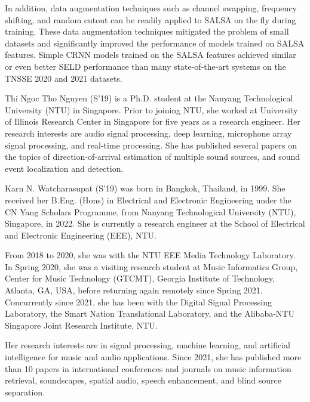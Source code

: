 \documentclass[journal]{IEEEtran}
\begin{document}
In addition, data augmentation techniques such as channel swapping, frequency shifting, and random cutout can be readily applied to SALSA on the fly during training. These data augmentation techniques mitigated the problem of small datasets and significantly improved the performance of models trained on SALSA features. Simple CRNN models trained on the SALSA features achieved similar or even better SELD performance than many state-of-the-art systems on the TNSSE 2020 and 2021 datasets.  



\clearpage
\begin{IEEEbiography}{Thi Ngoc Tho Nguyen} (S'19)
is a Ph.D. student at the Nanyang Technological University (NTU) in Singapore. Prior to joining NTU, she worked at University of Illinois Research Center in Singapore for five years as a research engineer. Her research interests are audio signal processing, deep learning, microphone array signal processing, and real-time processing. She has published several papers on the topics of direction-of-arrival estimation of multiple sound sources, and sound event localization and detection.
\end{IEEEbiography}

\begin{IEEEbiography}{Karn N. Watcharasupat} (S'19) was born in Bangkok, Thailand, in 1999. She received her B.Eng. (Hons) in Electrical and Electronic Engineering under the CN Yang Scholars Programme, from Nanyang Technological University (NTU), Singapore, in 2022. She is currently a research engineer at the School of Electrical and Electronic Engineering (EEE), NTU.

From 2018 to 2020, she was with the NTU EEE Media Technology Laboratory. In Spring 2020, she was a visiting research student at Music Informatics Group, Center for Music Technology (GTCMT), Georgia Institute of Technology, Atlanta, GA, USA, before returning again remotely since Spring 2021. Concurrently since 2021, she has been with the Digital Signal Processing Laboratory, the Smart Nation Translational Laboratory, and the Alibaba-NTU Singapore Joint Research Institute, NTU.

Her research interests are in signal processing, machine learning, and artificial intelligence for music and audio applications. Since 2021, she has published more than 10 papers in international conferences and journals on music information retrieval, soundscapes, spatial audio, speech enhancement, and blind source separation.
\end{IEEEbiography}
\end{document}
